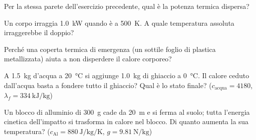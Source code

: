 \begin{esercizio}
Per la stessa parete dell'esercizio precedente, qual è la potenza termica dispersa?\\
\end{esercizio}

\begin{esercizio}
Un corpo irraggia \SI{1,0}{\kilo\watt} quando è a \SI{500}{\kelvin}. A quale temperatura assoluta irraggerebbe il doppio?\\
\end{esercizio}

\begin{esercizio}
Perché una coperta termica di emergenza (un sottile foglio di plastica metallizzata) aiuta a non disperdere il calore corporeo?\\
\end{esercizio}

\begin{esercizio}
A \SI{1,5}{\kilogram} d'acqua a \SI{20}{\celsius} si aggiunge \SI{1,0}{\kilogram} di ghiaccio a \SI{0}{\celsius}. Il calore ceduto dall'acqua basta a fondere tutto il ghiaccio? Qual è lo stato finale? ($c_{\text{acqua}} = 4180$, $\lambda_f = \SI{334}{\kilo\joule\per\kilogram}$)\\
\end{esercizio}

\begin{esercizio}
Un blocco di alluminio di \SI{300}{\gram} cade da \SI{20}{\metre} e si ferma al suolo; tutta l'energia cinetica dell'impatto si trasforma in calore nel blocco. Di quanto aumenta la sua temperatura? ($c_{\text{Al}} = \SI{880}{\joule\per\kilogram\per\kelvin}$, $g = \SI{9,81}{\newton\per\kilogram}$)\\
\end{esercizio}
